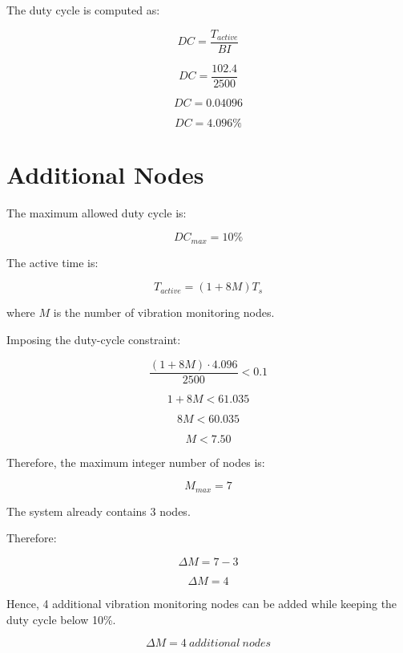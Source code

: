 \documentclass[a4paper,12pt]{article}
\begin{document}
The duty cycle is computed as:

\[
DC=\frac{T_{active}}{BI}
\]

\[
DC=\frac{102.4}{2500}
\]

\[
DC=0.04096
\]

\[
DC=4.096\%
\]

\section{Additional Nodes}

The maximum allowed duty cycle is:

\[
DC_{max}=10\%
\]

The active time is:

\[
T_{active}=(1+8M)T_s
\]

where \(M\) is the number of vibration monitoring nodes.

Imposing the duty-cycle constraint:

\[
\frac{(1+8M)\cdot4.096}{2500}<0.1
\]

\[
1+8M<61.035
\]

\[
8M<60.035
\]

\[
M<7.50
\]

Therefore, the maximum integer number of nodes is:

\[
M_{max}=7
\]

The system already contains 3 nodes.

Therefore:

\[
\Delta M=7-3
\]

\[
\Delta M=4
\]

Hence, 4 additional vibration monitoring nodes can be added while keeping the duty cycle below 10\%.

\[
\Delta M=4\ additional\ nodes
\]
\end{document}
